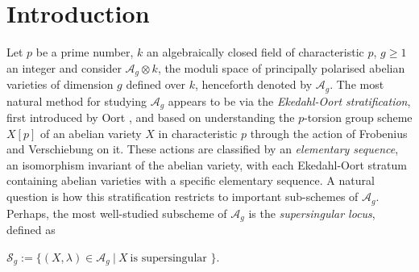 \documentclass[11pt,table]{amsart}
\numberwithin{equation}{section}
\theoremstyle{definition}
\theoremstyle{remark}
\theoremstyle{remark}
\begin{document}

\section{Introduction}
Let $p$ be a prime number, $k$ an algebraically closed field of characteristic $p$, $ g \ge 1$ an integer and consider $\mathcal{A}_g \otimes k $, the moduli space of principally polarised abelian varieties of dimension $g$ defined over $k$, henceforth denoted by $\mathcal{A}_g$. The most natural method for studying $\mathcal{A}_g$ appears to be via the \textit{Ekedahl-Oort stratification}, first introduced by Oort \cite{oort2001stratification}, and based on understanding the $p$-torsion group scheme $X[p]$ of an abelian variety $X$ in characteristic $p$ through the action of Frobenius and Verschiebung on it. These actions are classified by an \textit{elementary sequence}, an isomorphism invariant of the abelian variety, with each Ekedahl-Oort stratum containing abelian varieties with a specific elementary sequence. A natural question is how this stratification restricts to important sub-schemes of $\mathcal{A}_g$. Perhaps, the most well-studied subscheme of $\mathcal{A}_g$ is the \textit{supersingular locus}, defined as
\begin{center}
    $\mathcal{S}_{g} := \{ (X, \lambda) \in \mathcal{A}_{g} \ \vert \ X  \ \text{is supersingular } \}$.
\end{center}
\end{document}
